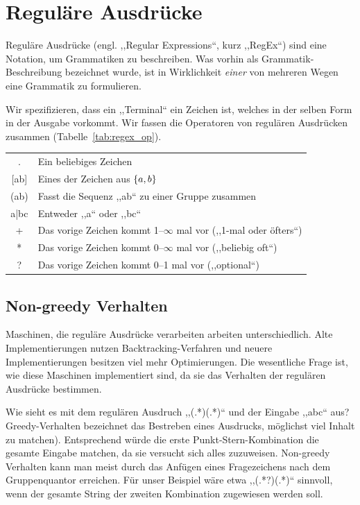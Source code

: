 \section{Reguläre Ausdrücke}
%
Reguläre Ausdrücke (engl. ,,Regular Expressions``, kurz ,,RegEx``) sind eine Notation, um Grammatiken zu beschreiben. Was vorhin als Grammatik-Beschreibung bezeichnet wurde, ist in Wirklichkeit \emph{einer} von mehreren Wegen eine Grammatik zu formulieren. 

Wir spezifizieren, dass ein ,,Terminal`` ein Zeichen ist, welches in der selben Form in der Ausgabe vorkommt. Wir fassen die Operatoren von regulären Ausdrücken zusammen (Tabelle~\ref{tab:regex_op}).

\begin{table}[h]
 \begin{center}
  \begin{tabular}{cl}
   \hline
    .     & Ein beliebiges Zeichen \\
 {[}ab{]} & Eines der Zeichen aus $\left\{a, b\right\}$ \\
    (ab)  & Fasst die Sequenz ,,ab`` zu einer Gruppe zusammen \\
    a|bc  & Entweder ,,a`` oder ,,bc`` \\
    +     & Das vorige Zeichen kommt 1--$\infty$ mal vor (,,1-mal oder öfters``) \\
    *     & Das vorige Zeichen kommt 0--$\infty$ mal vor (,,beliebig oft``) \\
    ?     & Das vorige Zeichen kommt 0--1 mal vor (,,optional``) \\
   \hline
  \end{tabular}
 \end{center}
\end{table}

\subsection{Non-greedy Verhalten}
%
Maschinen, die reguläre Ausdrücke verarbeiten arbeiten unterschiedlich. Alte Implementierungen nutzen Backtracking-Verfahren und neuere Implementierungen besitzen viel mehr Optimierungen. Die wesentliche Frage ist, wie diese Maschinen implementiert sind, da sie das Verhalten der regulären Ausdrücke bestimmen.

Wie sieht es mit dem regulären Ausdruch ,,(.*)(.*)`` und der Eingabe ,,abc`` aus? Greedy-Verhalten bezeichnet das Bestreben eines Ausdrucks, möglichst viel Inhalt zu matchen). Entsprechend würde die erste Punkt-Stern-Kombination die gesamte Eingabe matchen, da sie versucht sich alles zuzuweisen. Non-greedy Verhalten kann man meist durch das Anfügen eines Fragezeichens nach dem Gruppenquantor erreichen. Für unser Beispiel wäre etwa ,,(.*?)(.*)`` sinnvoll, wenn der gesamte String der zweiten Kombination zugewiesen werden soll.

